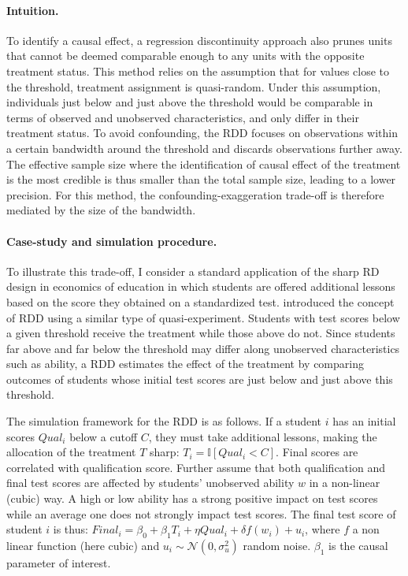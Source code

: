 \documentclass[usletter, 12pt]{article}
\begin{document}
     			\paragraph{Intuition.} To identify a causal effect, a regression discontinuity approach also prunes units that cannot be deemed comparable enough to any units with the opposite treatment status. This method relies on the assumption that for values close to the threshold, treatment assignment is quasi-random. Under this assumption, individuals just below and just above the threshold would be comparable in terms of observed and unobserved characteristics, and only differ in their treatment status. To avoid confounding, the RDD focuses on observations within a certain bandwidth around the threshold and discards observations further away. The effective sample size where the identification of causal effect of the treatment is the most credible is thus smaller than the total sample size, leading to a lower precision. For this method, the confounding-exaggeration trade-off is therefore mediated by the size of the bandwidth.
			
			\paragraph{Case-study and simulation procedure.} To illustrate this trade-off, I consider a standard application of the sharp RD design in economics of education in which students are offered additional lessons based on the score they obtained on a standardized test. \cite{thistlethwaite_regression-discontinuity_1960} introduced the concept of RDD using a similar type of quasi-experiment. Students with test scores below a given threshold receive the treatment while those above do not. Since students far above and far below the threshold may differ along unobserved characteristics such as ability, a RDD estimates the effect of the treatment by comparing outcomes of students whose initial test scores are just below and just above this threshold. 
        
        			 The simulation framework for the RDD is as follows. If a student $i$ has an initial scores $Qual_{i}$ below a cutoff $C$, they must take additional lessons, making the allocation of the treatment $T$ sharp: $T_i = \mathbb{I}[Qual_{i} < C]$. Final scores are correlated with qualification score. Further assume that both qualification and final test scores are affected by students' unobserved ability $w$ in a non-linear (cubic) way. A high or low ability has a strong positive impact on test scores while an average one does not strongly impact test scores. The final test score of student $i$ is thus: $Final_{i} = \beta_{0} + \beta_{1} T_i + \eta Qual_{i} +  \delta f(w_i) + u_{i}$, where $f$ a non linear function (here cubic) and $u_{i} \sim \mathcal{N}(0, \sigma_{u}^{2})$ random noise. $\beta_{1}$ is the causal parameter of interest. 
        
\end{document}
